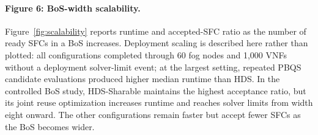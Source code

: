 \caption{BoS-width runtime and accepted-SFC ratio.}

\paragraph{Figure 6: BoS-width scalability.}
Figure~\ref{fig:scalability} reports runtime and accepted-SFC ratio as the number of ready SFCs in a BoS increases. Deployment scaling is described here rather than plotted: all configurations completed through 60 fog nodes and 1,000 VNFs without a deployment solver-limit event; at the largest setting, repeated PBQS candidate evaluations produced higher median runtime than HDS. In the controlled BoS study, HDS-Sharable maintains the highest acceptance ratio, but its joint reuse optimization increases runtime and reaches solver limits from width eight onward. The other configurations remain faster but accept fewer SFCs as the BoS becomes wider.
